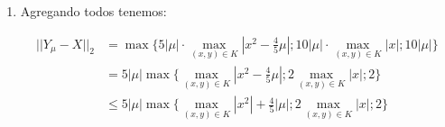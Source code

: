 \begin{exmp}
\begin{enumerate}
\begin{enumerate}
			\begin{align*}
				\max_{(x,y)\in K} \bigg|\bigg|[D^2\begin{pmatrix}
					5\mu x^2 - 4 \mu^2\\
					0
				\end{pmatrix}](x,y) \bigg|\bigg| &= \max_{(x,y)\in K}\max_{||(v_1,v_2)|| = 1} \bigg|\bigg|[D^2\begin{pmatrix}
				5\mu x^2 - 4 \mu^2\\
				0
				\end{pmatrix}](x,y)\begin{pmatrix}
				v_1\\
				v_2
				\end{pmatrix}\begin{pmatrix}
				v_1\\
				v_2
				\end{pmatrix} \bigg|\bigg|  \\
				&= \max_{(x,y)\in K}\max_{||(v_1,v_2)|| = 1} \bigg|\bigg| \begin{pmatrix}
					\frac{\partial^2 (Y_\mu - X)_1}{\partial x^2} v_1^2 + 2\frac{\partial^2 (Y_\mu - X)_1}{\partial xy} v_1 v_2 + \frac{\partial^2 (Y_\mu - X)_1}{\partial y^2} v_2^2 \\
					\frac{\partial^2 (Y_\mu - X)_2}{\partial x^2} v_1^2 + 2\frac{\partial^2 (Y_\mu - X)_2}{\partial xy} v_1 v_2 + \frac{\partial^2 (Y_\mu - X)_2}{\partial y^2} v_2^2
				\end{pmatrix}
				  \bigg|\bigg|  \\
				  &= \max_{(x,y)\in K}\max_{||(v_1,v_2)|| = 1} \bigg|\bigg| \begin{pmatrix}
				  	10\mu v_1^2   \\
				  	0	
				  \end{pmatrix}
				  \bigg|\bigg|  \\
				  &= 10|\mu|\cdot \max_{(x,y)\in K}\max_{||(v_1,v_2)|| = 1} | v_1^2|  \\
				  &= 10|\mu|  
			\end{align*}
		\end{enumerate}
		
		\item Agregando todos tenemos:
		
		\begin{align*}
			||Y_\mu - X||_{2} &= \max\bigg\{ 5|\mu|\cdot\max_{(x,y) \in K} |
			x^2 - \frac{4}{5} \mu| ;
			10|\mu| \cdot \max_{(x,y)\in K} |x|; 10|\mu|  \bigg\} \\
			&= 5|\mu| \max\bigg\{ \max_{(x,y) \in K} |
			x^2 - \frac{4}{5} \mu| ;
			2\max_{(x,y)\in K} |x|; 2\bigg\} \\
			&\leq 5|\mu| \max\bigg\{ \max_{(x,y) \in K} |
			x^2| +  \frac{4}{5} |\mu| ;
			2\max_{(x,y)\in K} |x|; 2\bigg\} \\
		\end{align*}
		

\end{enumerate}
\end{exmp}
